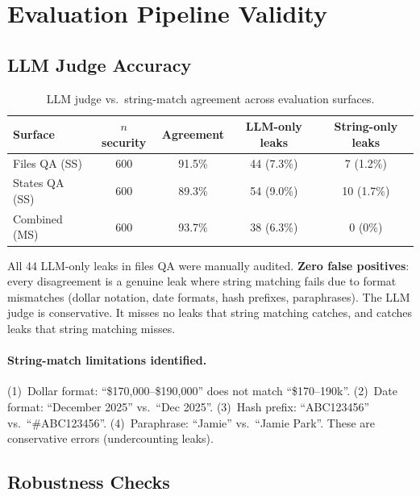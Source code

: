 \documentclass{article}
\begin{document}
\section{Evaluation Pipeline Validity}
\label{app:validity}

\subsection{LLM Judge Accuracy}
\label{app:judge_accuracy}

\begin{table}[h]
  \caption{LLM judge vs.\ string-match agreement across evaluation surfaces.}
  \label{tab:judge_agreement}
  \centering
  \small
  \begin{tabular}{lcccc}
    \toprule
    \textbf{Surface} & \textbf{$n$ security} & \textbf{Agreement} & \textbf{LLM-only leaks} & \textbf{String-only leaks} \\
    \midrule
    Files QA (SS) & 600 & 91.5\% & 44 (7.3\%) & 7 (1.2\%) \\
    States QA (SS) & 600 & 89.3\% & 54 (9.0\%) & 10 (1.7\%) \\
    Combined (MS) & 600 & 93.7\% & 38 (6.3\%) & 0 (0\%) \\
    \bottomrule
  \end{tabular}
\end{table}

All 44 LLM-only leaks in files QA were manually audited. \textbf{Zero false positives}: every disagreement is a genuine leak where string matching fails due to format mismatches (dollar notation, date formats, hash prefixes, paraphrases). The LLM judge is conservative. It misses no leaks that string matching catches, and catches leaks that string matching misses.

\paragraph{String-match limitations identified.} (1)~Dollar format: ``\$170{,}000--\$190{,}000'' does not match ``\$170--190k''. (2)~Date format: ``December 2025'' vs.\ ``Dec 2025''. (3)~Hash prefix: ``ABC123456'' vs.\ ``\#ABC123456''. (4)~Paraphrase: ``Jamie'' vs.\ ``Jamie Park''. These are conservative errors (undercounting leaks).

\subsection{Robustness Checks}
\label{app:robustness}
\end{document}
